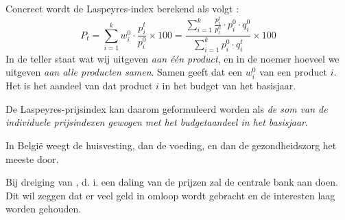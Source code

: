 \par Concreet wordt de Laspeyres-index berekend als volgt :
$$P_t=\sum_{i=1}^k w_i^0\cdot\frac{p_i^t}{p_i^0}\times 100=\frac{\sum_{i=1}^k \frac{p_i^t}{p_t^0}\cdot p_i^{0}\cdot q_i^{0}}{\sum_{i=1}^k p_i^{0}\cdot q_i^{t}}\times 100$$
In de teller staat wat wij uitgeven \textit{aan \'e\'en product}, en in de noemer hoeveel we uitgeven \textit{aan alle producten samen}. Samen geeft dat een  $w_i^0$ van een product $i$. Het is het aandeel van dat product $i$ in het budget van het basisjaar.
\par De Laspeyres-prijsindex kan daarom geformuleerd worden als \textit{de som van de individuele prijsindexen gewogen met het budgetaandeel in het basisjaar}.
\par In Belgi\"e weegt de huisvesting, dan de voeding, en dan de gezondheidszorg het meeste door.\\

\par Bij dreiging van , d. i. een daling van de prijzen zal de centrale bank aan  doen. Dit wil zeggen dat er veel geld in omloop wordt gebracht en de interesten laag worden gehouden.